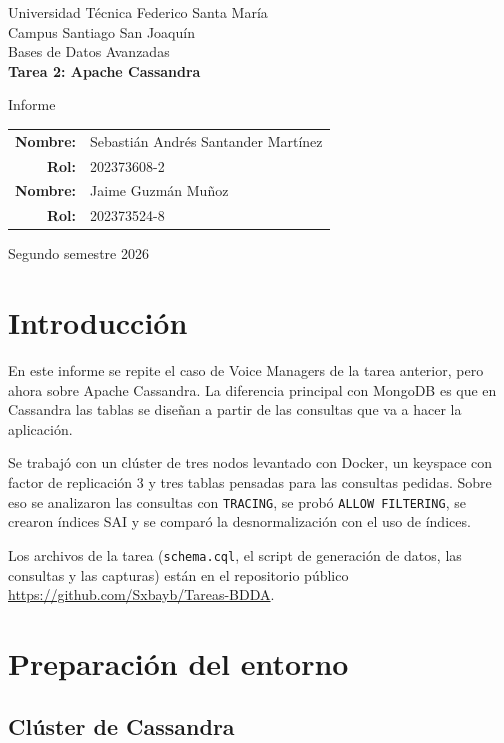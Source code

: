 \documentclass[11pt,a4paper]{article}
\begin{document}
\begin{titlepage}
	\centering
	\vspace*{1cm}
	{\Large Universidad Técnica Federico Santa María\\}
	{\large Campus Santiago San Joaquín\\[0.3em]
	Bases de Datos Avanzadas\\[3cm]}
	{\Huge\bfseries Tarea 2: Apache Cassandra\\[1.5cm]}
	{\Large Informe\par}
	\vfill
	\begin{tabular}{rl}
		\textbf{Nombre:} & Sebastián Andrés Santander Martínez\\
		\textbf{Rol:} & 202373608-2\\[0.5em]
		\textbf{Nombre:} & Jaime Guzmán Muñoz\\
		\textbf{Rol:} & 202373524-8\\
	\end{tabular}
	\vfill
	Segundo semestre 2026
\end{titlepage}

\tableofcontents
\newpage

\section{Introducción}

En este informe se repite el caso de Voice Managers de la tarea anterior, pero ahora sobre
Apache Cassandra. La diferencia principal con MongoDB es que en Cassandra las tablas se
diseñan a partir de las consultas que va a hacer la aplicación.

Se trabajó con un clúster de tres nodos levantado con Docker, un keyspace con factor de
replicación 3 y tres tablas pensadas para las consultas pedidas. Sobre eso se analizaron las
consultas con \texttt{TRACING}, se probó \texttt{ALLOW FILTERING}, se crearon índices SAI y
se comparó la desnormalización con el uso de índices.

Los archivos de la tarea (\texttt{schema.cql}, el script de generación de datos, las
consultas y las capturas) están en el repositorio público
\url{https://github.com/Sxbayb/Tareas-BDDA}.

\section{Preparación del entorno}

\subsection{Clúster de Cassandra}
\end{document}
